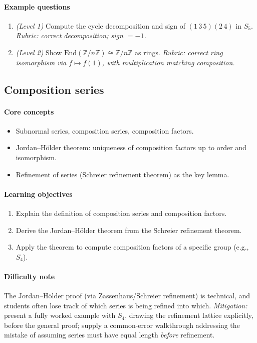 \documentclass{article}
\begin{document}
\paragraph{Example questions}
\begin{enumerate}[nosep]
  \item \emph{(Level 1)} Compute the cycle decomposition and sign of $(1\,3\,5)(2\,4)$ in $S_5$. \emph{Rubric: correct decomposition; sign $= -1$.}
  \item \emph{(Level 2)} Show $\mathrm{End}(\mathbb{Z}/n\mathbb{Z}) \cong \mathbb{Z}/n\mathbb{Z}$ as rings. \emph{Rubric: correct ring isomorphism via $f \mapsto f(1)$, with multiplication matching composition.}
\end{enumerate}

\subsection{Composition series}
\paragraph{Core concepts}
\begin{itemize}[nosep]
  \item Subnormal series, composition series, composition factors.
  \item Jordan--H\"older theorem: uniqueness of composition factors up to order and isomorphism.
  \item Refinement of series (Schreier refinement theorem) as the key lemma.
\end{itemize}
\paragraph{Learning objectives}
\begin{enumerate}[nosep]
  \item Explain the definition of composition series and composition factors.
  \item Derive the Jordan--H\"older theorem from the Schreier refinement theorem.
  \item Apply the theorem to compute composition factors of a specific group (e.g., $S_4$).
\end{enumerate}
\paragraph{Difficulty note}
The Jordan--H\"older proof (via Zassenhaus/Schreier refinement) is technical, and students often lose track of which series is being refined into which. \emph{Mitigation:} present a fully worked example with $S_4$, drawing the refinement lattice explicitly, before the general proof; supply a common-error walkthrough addressing the mistake of assuming series must have equal length \emph{before} refinement.
\end{document}
